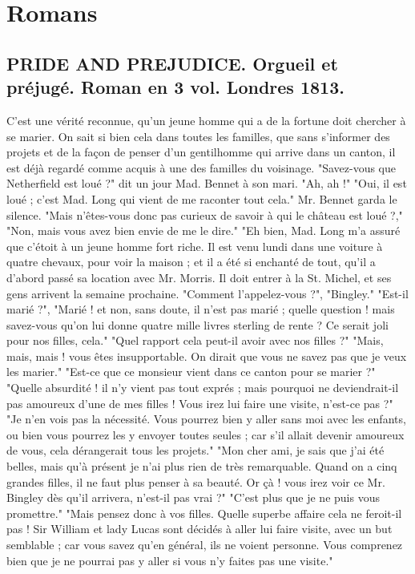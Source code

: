 \setcounter{page}{373}
\chapter{Romans}
\section{PRIDE AND PREJUDICE. Orgueil et préjugé. Roman en 3 vol. Londres 1813.}
C’est une vérité reconnue, qu’un jeune homme qui a de la fortune doit chercher à se marier. On sait si bien cela dans toutes les familles, que sans s’informer des projets et de la façon de penser d’un gentilhomme qui arrive dans un canton, il est déjà regardé comme acquis à une des familles du voisinage.
"Savez-vous que Netherfield est loué ?" dit un jour Mad. Bennet à son mari.
"Ah, ah !"
"Oui, il est loué ; c’est Mad. Long qui vient de me raconter tout cela."
Mr. Bennet garda le silence.
"Mais n’êtes-vous donc pas curieux de savoir à qui le château est loué ?,"
"Non, mais vous avez bien envie de me le dire."
"Eh bien, Mad. Long m’a assuré que c’étoit à un jeune homme fort riche. Il est venu lundi dans une voiture à quatre chevaux,\setcounter{page}{374} pour voir la maison ; et il a été si enchanté de tout, qu'il a d'abord passé sa location avec Mr. Morris. Il doit entrer à la St. Michel, et ses gens arrivent la semaine prochaine.
"Comment l'appelez-vous ?",
"Bingley."
"Est-il marié ?",
"Marié ! et non, sans doute, il n'est pas marié ; quelle question ! mais savez-vous qu'on lui donne quatre mille livres sterling de rente ? Ce serait joli pour nos filles, cela."
"Quel rapport cela peut-il avoir avec nos filles ?"
"Mais, mais, mais ! vous êtes insupportable. On dirait que vous ne savez pas que je veux les marier."
"Est-ce que ce monsieur vient dans ce canton pour se marier ?"
"Quelle absurdité ! il n'y vient pas tout exprés ; mais pourquoi ne deviendrait-il pas amoureux d'une de mes filles ! Vous irez lui faire une visite, n'est-ce pas ?"
"Je n'en vois pas la nécessité. Vous pourrez bien y aller sans moi avec les enfants, ou bien vous pourrez les y envoyer toutes seules ; car s'il allait devenir amoureux de vous, cela dérangerait tous les projets."
\setcounter{page}{375}
"Mon cher ami, je sais que j’ai été belles, mais qu’à présent je n’ai plus rien de très remarquable. Quand on a cinq grandes filles, il ne faut plus penser à sa beauté. Or çà ! vous irez voir ce Mr. Bingley dès qu’il arrivera, n’est-il pas vrai ?"
"C’est plus que je ne puis vous promettre."
"Mais pensez donc à vos filles. Quelle superbe affaire cela ne feroit-il pas ! Sir William et lady Lucas sont décidés à aller lui faire visite, avec un but semblable ; car vous savez qu’en général, ils ne voient personne. Vous comprenez bien que je ne pourrai pas y aller si vous n’y faites pas une visite."
